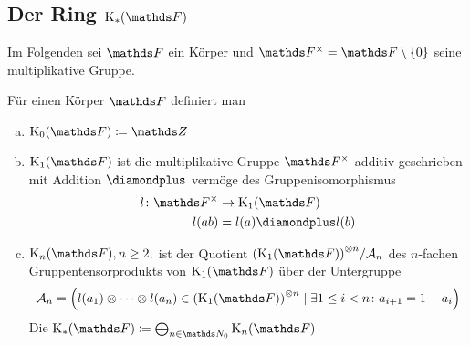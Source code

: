 \documentclass[ngerman,fontsize=11pt, paper=a4, parskip=half, titlepage=true, toc=bib]{scrartcl}
\begin{document}
\subsection{Der Ring $\KF$}
Im Folgenden sei $\F$ ein Körper und $\Fx=\F\setminus \{0\}$ seine
multiplikative Gruppe.

\begin{Def}[$\KF$]\label{defkf}
  Für einen Körper $\F$ definiert man
  \begin{enumerate}[a)]
  \item $\K_0(\F)\coloneqq \Z$
  \item $\K_1(\F)$ ist die multiplikative Gruppe $\Fx$ 
    additiv geschrieben mit Addition $\p$
    vermöge des Gruppenisomorphismus 
    \begin{align*}
      l\colon \Fx&\to \K_1(\F)\\
      l(ab)&=l(a)\p l(b)
    \end{align*}
  \item $\KnF, n\geq 2,$ ist der Quotient 
    ${(\K_1(\F))}^{\otimes n}/\calA_n$
    des $n$-fachen Gruppentensorprodukts von $\K_1(\F)$ über der
    Untergruppe 
    \begin{gather*}
      \calA_n=\left( 
        l(a_1)\otimes\dotsb\otimes l(a_n)
        \in {(\K_1(\F))}^{\otimes n}
        \mid  %
        \exists 1\leq i < n \colon a_{i+1}=1-a_i 
      \right)
    \end{gather*}
    Die  $\KF\coloneqq \bigoplus_{n\in\N_0}\KnF$
  \end{enumerate}
\end{Def}
\end{document}
